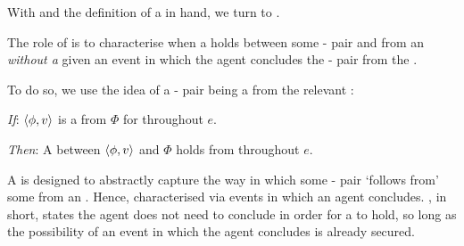 \begin{note}
  With \supportI{} and the definition of a \pwitP{} in hand, we turn to \supportII{}.

  The role of \supportII{} is to characterise when a \ros{} holds between some - pair and \pool{} from an \agpe{} \emph{without a} given an event in which the agent concludes the - pair from the \pool{}.

  To do so, we use the idea of a - pair being a \fc{} from the relevant \pool{}:

  \begin{idea}[\supportII{}]%
    \label{idea:support:possible}%
    \vspace{-\baselineskip}
    \begin{itenum}
    \item[\emph{If}:]
      \(\langle \phi, v \rangle\) is a  from \(\Phi\) for \vAgent{} throughout \(e\).
    \item[\emph{Then}:]
      A \ros{} between \(\langle \phi, v \rangle\) and \(\Phi\) holds from  throughout \(e\).
    \end{itenum}
    \vspace{-\baselineskip}
  \end{idea}

  \noindent%
  A \ros{} is designed to abstractly capture the way in which some - pair `follows from' some \pool{} from an \agpe{}.
  Hence, \supportI{} characterised  via events in which an agent concludes.
  \supportII{}, in short, states the agent does not need to conclude in order for a \ros{} to hold, so long as the possibility of an event in which the agent concludes is already secured.
\end{note}



